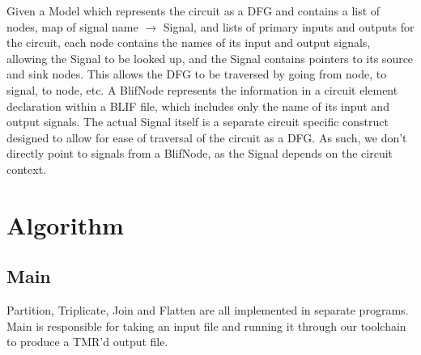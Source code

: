 \documentclass[12pt,final,oneside,a4paper]{dwThesis} %
\renewcommand\algorithmiccomment[1]{%
  \hfill$\triangleright$\ \parbox[t]{.25\linewidth}{#1}%
}
\begin{document}
\renewcommand\algorithmiccomment[1]{%
  \hfill$\triangleright$\ \parbox[t]{.25\linewidth}{#1}%
}
   Given a Model which represents the circuit as a DFG and contains a list of nodes, map of signal
   name $\to$ Signal, and lists of primary inputs and outputs for the circuit,
   each node contains the names of its input and output signals, allowing the
   Signal to be looked up, and the Signal contains pointers to its source and
   sink nodes.  This allows the DFG to be traversed by going from node, to
   signal, to node, etc.  A BlifNode represents the information in a circuit
   element declaration within a \gls{BLIF} file, which includes only the name
   of its input and output signals. The actual Signal itself is a separate
   circuit specific construct designed to allow for ease of traversal of the
   circuit as a \gls{DFG}.  As such, we don't directly point to signals from a
   BlifNode, as the Signal depends on the circuit context.

   \newpage 
   \section{Algorithm}
   \label{secAlgorithm} 
   \subsection{Main}

   Partition, Triplicate, Join and Flatten are all implemented in separate
   programs. Main is responsible for taking an input file and running it
   through our toolchain to produce a TMR'd output file.
\end{document}

